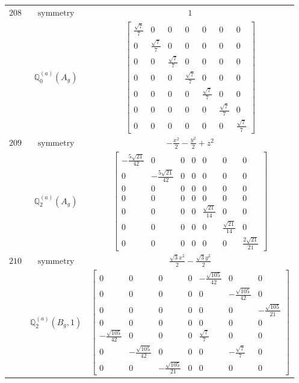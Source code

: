 \documentclass[fleqn,8pt,landscape]{jsarticle}
\begin{document}
\begin{longtable}{ccc}
$ 208 $ & $ \text{symmetry} $ & $ 1 $ \\
$  $ & $ \mathbb{Q}_{0}^{(a)}(A_{g}) $ & $ \begin{bmatrix} \frac{\sqrt{7}}{7} & 0 & 0 & 0 & 0 & 0 & 0 \\ 0 & \frac{\sqrt{7}}{7} & 0 & 0 & 0 & 0 & 0 \\ 0 & 0 & \frac{\sqrt{7}}{7} & 0 & 0 & 0 & 0 \\ 0 & 0 & 0 & \frac{\sqrt{7}}{7} & 0 & 0 & 0 \\ 0 & 0 & 0 & 0 & \frac{\sqrt{7}}{7} & 0 & 0 \\ 0 & 0 & 0 & 0 & 0 & \frac{\sqrt{7}}{7} & 0 \\ 0 & 0 & 0 & 0 & 0 & 0 & \frac{\sqrt{7}}{7} \end{bmatrix} $ \\ \hline
$ 209 $ & $ \text{symmetry} $ & $ - \frac{x^{2}}{2} - \frac{y^{2}}{2} + z^{2} $ \\
$  $ & $ \mathbb{Q}_{2}^{(a)}(A_{g}) $ & $ \begin{bmatrix} - \frac{5 \sqrt{21}}{42} & 0 & 0 & 0 & 0 & 0 & 0 \\ 0 & - \frac{5 \sqrt{21}}{42} & 0 & 0 & 0 & 0 & 0 \\ 0 & 0 & 0 & 0 & 0 & 0 & 0 \\ 0 & 0 & 0 & 0 & 0 & 0 & 0 \\ 0 & 0 & 0 & 0 & \frac{\sqrt{21}}{14} & 0 & 0 \\ 0 & 0 & 0 & 0 & 0 & \frac{\sqrt{21}}{14} & 0 \\ 0 & 0 & 0 & 0 & 0 & 0 & \frac{2 \sqrt{21}}{21} \end{bmatrix} $ \\ \hline
$ 210 $ & $ \text{symmetry} $ & $ \frac{\sqrt{3} x^{2}}{2} - \frac{\sqrt{3} y^{2}}{2} $ \\
$  $ & $ \mathbb{Q}_{2}^{(a)}(B_{g},1) $ & $ \begin{bmatrix} 0 & 0 & 0 & 0 & - \frac{\sqrt{105}}{42} & 0 & 0 \\ 0 & 0 & 0 & 0 & 0 & - \frac{\sqrt{105}}{42} & 0 \\ 0 & 0 & 0 & 0 & 0 & 0 & - \frac{\sqrt{105}}{21} \\ 0 & 0 & 0 & 0 & 0 & 0 & 0 \\ - \frac{\sqrt{105}}{42} & 0 & 0 & 0 & \frac{\sqrt{7}}{7} & 0 & 0 \\ 0 & - \frac{\sqrt{105}}{42} & 0 & 0 & 0 & - \frac{\sqrt{7}}{7} & 0 \\ 0 & 0 & - \frac{\sqrt{105}}{21} & 0 & 0 & 0 & 0 \end{bmatrix} $ \\ \hline

\end{longtable}
\end{document}
